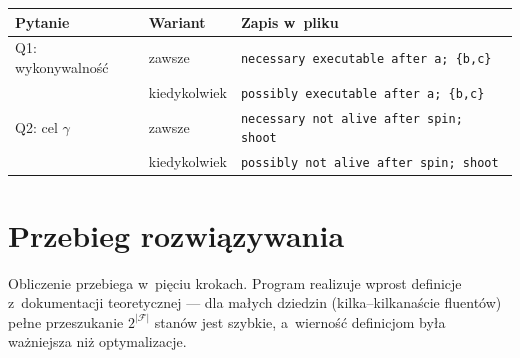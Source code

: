 \documentclass[11pt,a4paper]{article}
\begin{document}
\begin{center}
\small
\begin{tabular}{@{}lll@{}}
\toprule
\textbf{Pytanie} & \textbf{Wariant} & \textbf{Zapis w~pliku} \\
\midrule
Q1: wykonywalność & zawsze       & \texttt{necessary executable after a; \{b,c\}} \\
                  & kiedykolwiek & \texttt{possibly executable after a; \{b,c\}} \\
Q2: cel $\gamma$  & zawsze       & \texttt{necessary not alive after spin; shoot} \\
                  & kiedykolwiek & \texttt{possibly not alive after spin; shoot} \\
\bottomrule
\end{tabular}
\end{center}

\section{Przebieg rozwiązywania}

Obliczenie przebiega w~pięciu krokach. Program realizuje wprost definicje
z~dokumentacji teoretycznej --- dla małych dziedzin (kilka--kilkanaście
fluentów) pełne przeszukanie $2^{|\mathcal{F}|}$ stanów jest szybkie,
a~wierność definicjom była ważniejsza niż optymalizacje.
\end{document}
